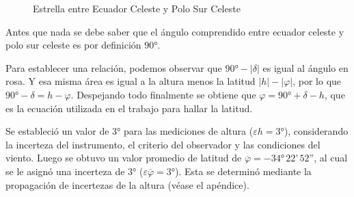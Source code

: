 \documentclass[11pt, a4paper]{article} %
\begin{document}
\begin{figure}[H]
    \centering
    \caption{Estrella entre Ecuador Celeste y Polo Sur Celeste}
    \label{fig:case-1}
\end{figure}

Antes que nada se debe saber que el ángulo comprendido entre ecuador celeste y polo sur celeste es por definición $\ang{90}$.

Para establecer una relación, podemos observar que $\ang{90}-|\delta|$ es igual al ángulo en rosa. Y esa misma área es igual a la altura menos la latitud $|h|-|\varphi|$, por lo que $\ang{90}-\delta = h-\varphi$. Despejando todo finalmente se obtiene que $\varphi=\ang{90}+\delta - h$, que es la ecuación utilizada en el trabajo para hallar la latitud. 

Se estableció un valor de $\ang{3}$ para las mediciones de altura ($\varepsilon h = \ang{3}$), considerando la incerteza del instrumento, el criterio del observador y las condiciones del viento. Luego se obtuvo un valor promedio de latitud de $\overline{\varphi} = -\ang{34} \,22\text{'}\, 52\text{''}$, al cual se le asignó una incerteza de $\ang{3}$ ($\varepsilon \overline{\varphi}=\ang{3}$). Esta se determinó  mediante la propagación de incertezas de la altura (véase el apéndice).
\end{document}
